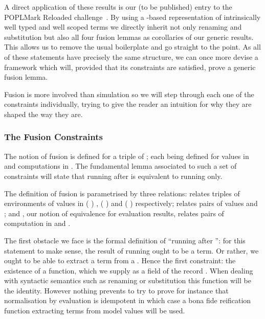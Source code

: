 A direct application of these results is our (to be published) entry to the
POPLMark Reloaded challenge~\citeyear{poplmarkreloaded}. By using a -based
representation of intrinsically well typed and well scoped terms we directly inherit
not only renaming and substitution but also all four fusion lemmas as corollaries
of our generic results. This allows us to remove the usual boilerplate
and go straight to the point.
As all of these statements have precisely the same structure, we can
once more devise a framework which will, provided that its constraints are
satisfied, prove a generic fusion lemma.

Fusion is more involved than simulation so we will step through
each one of the constraints individually, trying to give the reader an intuition
for why they are shaped the way they are.

\subsubsection{The Fusion Constraints}

The notion of fusion is defined for a triple of ; each 
being defined for values in  and computations in . The
fundamental lemma associated to such a set of constraints will state that
running  after  is equivalent to running  only.

The definition of fusion is parametrised by three relations:  relates
triples of environments of values in {( )  },
{( )  } and {( )  }
respectively;  relates pairs of values  and ;
and , our notion of equivalence for evaluation results, relates pairs
of computation in  and .


The first obstacle we face is the formal definition of ``running 
after '': for this statement to make sense, the result of running
 ought to be a term. Or rather, we ought to be able to extract a
term from a . Hence the first constraint: the existence of a 
function, which we supply as a field of the record . When dealing with
syntactic semantics such as renaming or substitution
this function will be the identity. However nothing prevents to try to prove for
instance that normalisation by evaluation is idempotent in which case a bona fide
reification function extracting terms from model values will be used.

